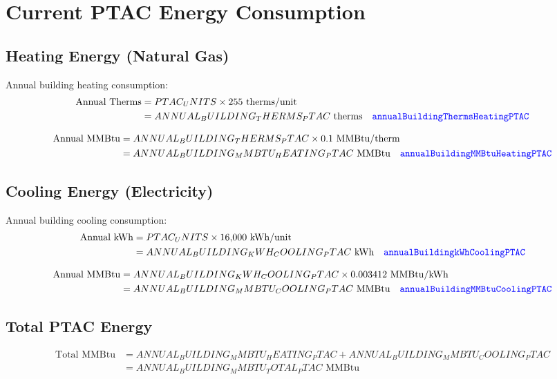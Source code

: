 \documentclass[11pt,letterpaper]{article}
\newcommand{\code}[1]{\textcolor{blue}{\texttt{#1}}}
\begin{document}
\section{Current PTAC Energy Consumption}

\subsection{Heating Energy (Natural Gas)}
Annual building heating consumption:
\begin{align}
\text{Annual Therms} &= {{PTAC_UNITS}} \times 255 \text{ therms/unit} \\
&= {{ANNUAL_BUILDING_THERMS_PTAC}} \text{ therms} \quad \code{annualBuildingThermsHeatingPTAC}
\end{align}

\begin{align}
\text{Annual MMBtu} &= {{ANNUAL_BUILDING_THERMS_PTAC}} \times 0.1 \text{ MMBtu/therm} \\
&= {{ANNUAL_BUILDING_MMBTU_HEATING_PTAC}} \text{ MMBtu} \quad \code{annualBuildingMMBtuHeatingPTAC}
\end{align}

\subsection{Cooling Energy (Electricity)}
Annual building cooling consumption:
\begin{align}
\text{Annual kWh} &= {{PTAC_UNITS}} \times 16{,}000 \text{ kWh/unit} \\
&= {{ANNUAL_BUILDING_KWH_COOLING_PTAC}} \text{ kWh} \quad \code{annualBuildingkWhCoolingPTAC}
\end{align}

\begin{align}
\text{Annual MMBtu} &= {{ANNUAL_BUILDING_KWH_COOLING_PTAC}} \times 0.003412 \text{ MMBtu/kWh} \\
&= {{ANNUAL_BUILDING_MMBTU_COOLING_PTAC}} \text{ MMBtu} \quad \code{annualBuildingMMBtuCoolingPTAC}
\end{align}

\subsection{Total PTAC Energy}
\begin{align}
\text{Total MMBtu} &= {{ANNUAL_BUILDING_MMBTU_HEATING_PTAC}} + {{ANNUAL_BUILDING_MMBTU_COOLING_PTAC}} \\
&= {{ANNUAL_BUILDING_MMBTU_TOTAL_PTAC}} \text{ MMBtu}
\end{align}
\end{document}
